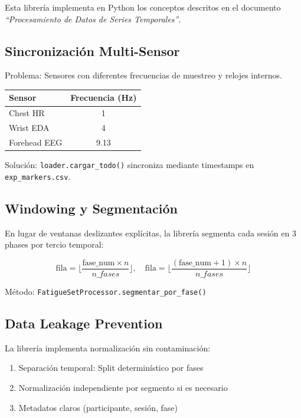 \documentclass[12pt,a4paper]{article}
\begin{document}
Esta librería implementa en Python los conceptos descritos en el documento \textit{``Procesamiento de Datos de Series Temporales''}.

\subsection{Sincronización Multi-Sensor}

Problema: Sensores con diferentes frecuencias de muestreo y relojes internos.

\begin{center}
\begin{tabular}{|l|c|}
\toprule
\textbf{Sensor} & \textbf{Frecuencia (Hz)} \\
\midrule
Chest HR & 1 \\
Wrist EDA & 4 \\
Forehead EEG & 9.13 \\
\bottomrule
\end{tabular}
\end{center}

Solución: \texttt{loader.cargar\_todo()} sincroniza mediante timestamps en \texttt{exp\_markers.csv}.

\subsection{Windowing y Segmentación}

En lugar de ventanas deslizantes explícitas, la librería segmenta cada sesión en 3 phases por tercio temporal:

$$\text{fila} = \lfloor \frac{\text{fase\_num} \times n}{n\_fases} \rfloor, \quad \text{fila} = \lfloor \frac{(\text{fase\_num}+1) \times n}{n\_fases} \rfloor$$

Método: \texttt{FatigueSetProcessor.segmentar\_por\_fase()}

\subsection{Data Leakage Prevention}

La librería implementa normalización sin contaminación:
\begin{enumerate}
    \item Separación temporal: Split determinístico por fases
    \item Normalización independiente por segmento si es necesario
    \item Metadatos claros (participante, sesión, fase)
\end{enumerate}
\end{document}
